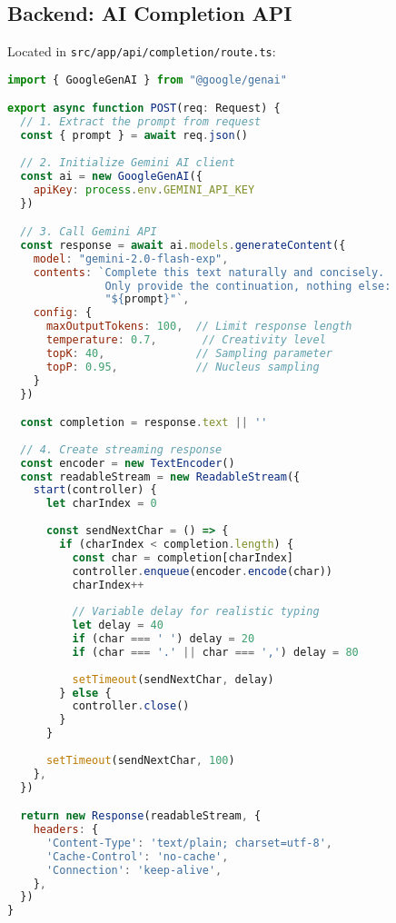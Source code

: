 \documentclass[11pt,a4paper]{article}
\begin{document}
\subsection{Backend: AI Completion API}

Located in \texttt{src/app/api/completion/route.ts}:

\begin{lstlisting}[language=JavaScript]
import { GoogleGenAI } from "@google/genai"

export async function POST(req: Request) {
  // 1. Extract the prompt from request
  const { prompt } = await req.json()
  
  // 2. Initialize Gemini AI client
  const ai = new GoogleGenAI({ 
    apiKey: process.env.GEMINI_API_KEY 
  })

  // 3. Call Gemini API
  const response = await ai.models.generateContent({
    model: "gemini-2.0-flash-exp",
    contents: `Complete this text naturally and concisely. 
               Only provide the continuation, nothing else:
               "${prompt}"`,
    config: {
      maxOutputTokens: 100,  // Limit response length
      temperature: 0.7,       // Creativity level
      topK: 40,              // Sampling parameter
      topP: 0.95,            // Nucleus sampling
    }
  })

  const completion = response.text || ''
  
  // 4. Create streaming response
  const encoder = new TextEncoder()
  const readableStream = new ReadableStream({
    start(controller) {
      let charIndex = 0
      
      const sendNextChar = () => {
        if (charIndex < completion.length) {
          const char = completion[charIndex]
          controller.enqueue(encoder.encode(char))
          charIndex++
          
          // Variable delay for realistic typing
          let delay = 40
          if (char === ' ') delay = 20
          if (char === '.' || char === ',') delay = 80
          
          setTimeout(sendNextChar, delay)
        } else {
          controller.close()
        }
      }
      
      setTimeout(sendNextChar, 100)
    },
  })

  return new Response(readableStream, {
    headers: {
      'Content-Type': 'text/plain; charset=utf-8',
      'Cache-Control': 'no-cache',
      'Connection': 'keep-alive',
    },
  })
}
\end{lstlisting}
\end{document}
